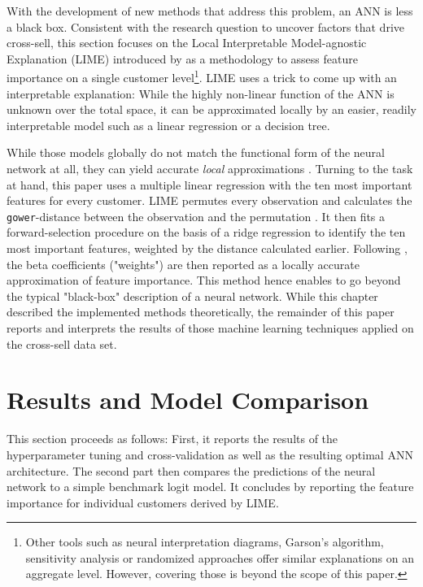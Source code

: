 \documentclass[12pt,a4paper]{article}
\let\code=\texttt
\begin{document}
With the development of new methods that address this problem, an ANN is less a black box.
Consistent with the research question to uncover factors that drive cross-sell, 
this section focuses on the Local Interpretable Model-agnostic Explanation (LIME) introduced by \cite{ribeiroWhyShouldTrust2016a} as a methodology
to assess feature importance on a single customer level\footnote{Other tools such as neural interpretation diagrams, Garson's algorithm, sensitivity analysis or randomized approaches
\citep{oldenIlluminatingBlackBox2002} offer similar explanations on an aggregate level. However, covering those is beyond the scope of this paper.}.
LIME uses a trick to come up with an interpretable explanation: While the highly non-linear function of the ANN is unknown over the total space,
it can be approximated locally by an easier, readily interpretable model such as a linear regression or a decision tree.

While those models globally do not match the functional form of the neural network at all, they can yield accurate \textit{local} approximations
\citep[see figure 3 for a visual example]{ribeiroWhyShouldTrust2016a}.
Turning to the task at hand, this paper uses a multiple linear regression with the ten most important features for every customer.
LIME permutes every observation and calculates the \code{gower}-distance between the observation and the permutation \citep{pedersenUnderstandingLime2018}.
It then fits a forward-selection procedure on the basis of a ridge regression \citep{pedersenPackageLimeLocal2018} to identify the ten most 
important features, weighted by the distance calculated earlier.
Following \cite{ribeiroWhyShouldTrust2016a}, the beta coefficients ("weights") are then reported as a locally accurate approximation of feature importance.
This method hence enables to go beyond the typical "black-box" description of a neural network.
While this chapter described the implemented methods theoretically, the remainder of this paper reports and interprets the results of those 
machine learning techniques applied on the cross-sell data set.

\section{Results and Model Comparison}
This section proceeds as follows: First, it reports the results of the hyperparameter tuning and cross-validation as well as the resulting optimal ANN architecture.
The second part then compares the predictions of the neural network to a simple benchmark logit model.
It concludes by reporting the feature importance for individual customers derived by LIME.
\end{document}
